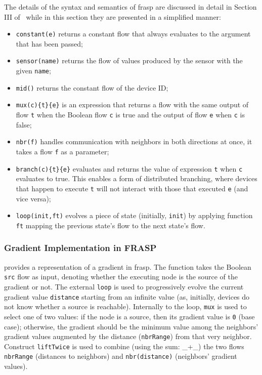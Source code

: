 The details of the syntax and semantics of \ac{frasp} are discussed in detail in Section III of~\cite{Casadei2023} while in this section they are presented in a simplified manner:

\begin{itemize}
    \item \texttt{constant(e)} returns a constant flow that always evaluates to the argument that has been passed;
    \item \texttt{sensor(name)} returns the flow of values produced by the sensor with the given \texttt{name};
    \item \texttt{mid()} returns the constant flow of the device ID;
    \item \texttt{mux(c)\{t\}\{e\}} is an expression that returns a flow with the same output of flow \texttt{t} when the Boolean flow \texttt{c} is true and the output of flow \texttt{e} when \texttt{c} is false;
    \item \texttt{nbr(f)} handles communication with neighbors in both directions at once, it takes a flow \texttt{f} as a parameter;
    \item \texttt{branch(c)\{t\}\{e\}} evaluates and returns the value of expression \texttt{t} when \texttt{c} evaluates to true. This enables a form of distributed branching, where devices that happen to execute \texttt{t} will not interact with those that executed \texttt{e} (and vice versa);
    \item \texttt{loop(init,ft)} evolves a piece of state (initially, \texttt{init}) by applying function \texttt{ft} mapping the previous state's flow to the next state's flow.
\end{itemize}

\subsubsection{Gradient Implementation in FRASP}

 provides a representation of a gradient in \ac{frasp}. The function takes the Boolean \texttt{src} flow as input, denoting whether the executing node is the source of the gradient or not. The external \texttt{loop} is used to progressively evolve the current gradient value \texttt{distance} starting from an infinite value (as, initially, devices do not know whether a source is reachable). Internally to the loop, \texttt{mux} is used to select one of two values: if the node is a source, then its gradient value is \texttt{0} (base case); otherwise, the gradient should be the minimum value among the neighbors' gradient values augmented by the distance (\texttt{nbrRange}) from that very neighbor. Construct \texttt{liftTwice} is used to combine (using the sum: \_+\_) the two flows \texttt{nbrRange} (distances to neighbors) and \texttt{nbr(distance)} (neighbors' gradient values).

